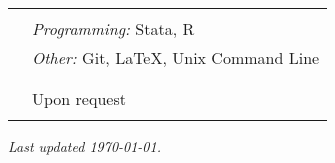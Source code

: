 \documentclass[letterpaper, 11pt]{article}
\begin{document}
\begin{longtable}{p{0.1in}p{5.9in}}





{\color{Maroon}{SKILLS}} \\
& \textit{Programming:} \hspace{10pt} Stata, R \\
& \textit{Other:} \hspace{45pt} Git, LaTeX, Unix Command Line \\ & \\


\multicolumn{2}{l}{{\color{Maroon}{REFERENCES}}} \\
& Upon request \\ & \\


\end{longtable}

\vfill 
\emph{Last updated {\today}.} \\
\end{document}
